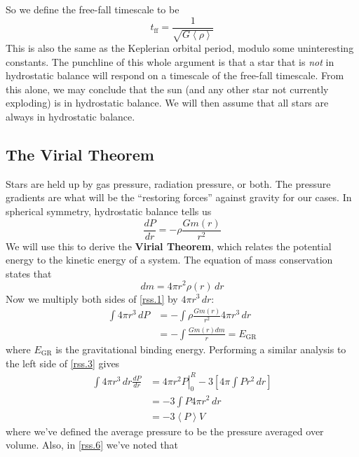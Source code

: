 \documentclass[10pt]{article}
\numberwithin{equation}{section}
\newcommand{\avg}[1]{\left\langle#1\right\rangle}
\begin{document}
	So we define the free-fall timescale to be
	\begin{equation}
		\label{mc.7} t_{\mathrm{ff}}=\frac{1}{\sqrt{G\avg{\rho}}}
	\end{equation}
	This is also the same as the Keplerian orbital period, modulo some uninteresting constants. The punchline of this whole argument is that a star that is \emph{not} in hydrostatic balance will respond on a timescale of the free-fall timescale. From this alone, we may conclude that the sun (and any other star not currently exploding) is in hydrostatic balance. We will then assume that all stars are always in hydrostatic balance.\\
	
	\subsection{The Virial Theorem}
	Stars are held up by gas pressure, radiation pressure, or both. The pressure gradients are what will be the ``restoring forces'' against gravity for our cases. In spherical symmetry, hydrostatic balance tells us
	\begin{equation}
		\label{rss.1} \frac{dP}{dr}=-\rho\frac{Gm(r)}{r^2}
	\end{equation}
	We will use this to derive the \textbf{Virial Theorem}, which relates the potential energy to the kinetic energy of a system. The equation of mass conservation states that
	\begin{equation}
		\label{rss.2} dm=4\pi r^2\rho(r)\,dr
	\end{equation}
	Now we multiply both sides of \eqref{rss.1} by $4\pi r^3\,dr$:
	\begin{align}
		\label{rss.3} \int 4\pi r^3\,dP&=-\int \rho\frac{Gm(r)}{r^2}4\pi r^3\,dr\\
		\label{rss.4} &= -\int\frac{Gm(r)dm}{r} = E_{\mathrm{GR}}
	\end{align}
	where $E_{\mathrm{GR}}$ is the gravitational binding energy. Performing a similar analysis to the left side of \eqref{rss.3} gives
	\begin{align}
		\label{rss.5} \int 4\pi r^3\,dr\frac{dP}{dr} &= \left.4\pi r^2P\right|_{0}^R-3\left[4\pi\int Pr^2\,dr\right]\\
		\label{rss.6} &= -3\int P4\pi  r^2\,dr\\
		\label{rss.7}&=-3\avg{P}V
	\end{align}
	where we've defined the average pressure to be the pressure
        averaged over volume. Also, in \eqref{rss.6} we've noted that
\end{document}
